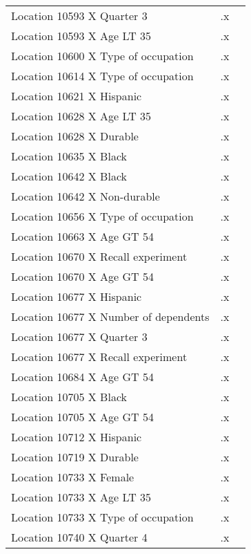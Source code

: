 \begin{tabular}{l*{2}{c}}
Location 10593 X Quarter 3&          .x&            \\
Location 10593 X Age LT 35&          .x&            \\
Location 10600 X Type of occupation&          .x&            \\
Location 10614 X Type of occupation&          .x&            \\
Location 10621 X Hispanic&          .x&            \\
Location 10628 X Age LT 35&          .x&            \\
Location 10628 X Durable&          .x&            \\
Location 10635 X Black&          .x&            \\
Location 10642 X Black&          .x&            \\
Location 10642 X Non-durable&          .x&            \\
Location 10656 X Type of occupation&          .x&            \\
Location 10663 X Age GT 54&          .x&            \\
Location 10670 X Recall experiment&          .x&            \\
Location 10670 X Age GT 54&          .x&            \\
Location 10677 X Hispanic&          .x&            \\
Location 10677 X Number of dependents&          .x&            \\
Location 10677 X Quarter 3&          .x&            \\
Location 10677 X Recall experiment&          .x&            \\
Location 10684 X Age GT 54&          .x&            \\
Location 10705 X Black&          .x&            \\
Location 10705 X Age GT 54&          .x&            \\
Location 10712 X Hispanic&          .x&            \\
Location 10719 X Durable&          .x&            \\
Location 10733 X Female&          .x&            \\
Location 10733 X Age LT 35&          .x&            \\
Location 10733 X Type of occupation&          .x&            \\
Location 10740 X Quarter 4&          .x&            \\

\end{tabular}
